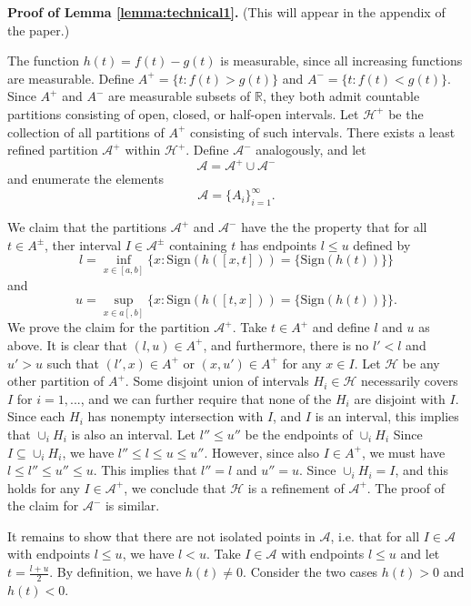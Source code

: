 \documentclass[12pt]{article}
\begin{document}
\textbf{Proof of Lemma \ref{lemma:technical1}.} (This will appear in the appendix of the paper.)

The function $h(t) = f(t) - g(t)$ is measurable, since all increasing
functions are measurable.  Define $A^+ = \{t: f(t) > g(t)\}$ and $A^-
= \{t: f(t) < g(t)\}$.  Since $A^+$ and $A^-$ are measurable subsets
of $\mathbb{R}$, they both admit countable partitions consisting of open, closed, or half-open
intervals.  Let $\mathcal{H}^+$ be the collection of all partitions of $A^+$ consisting of such intervals.
There exists a least refined partition $\mathcal{A}^+$ within $\mathcal{H}^+$.
Define $\mathcal{A}^-$ analogously, and let
\[
\mathcal{A} = \mathcal{A}^+ \cup \mathcal{A}^-
\]
and enumerate the elements
\[
\mathcal{A} = \{A_i\}_{i=1}^\infty.
\]

We claim that the partitions $\mathcal{A}^+$ and $\mathcal{A}^-$ have
the the property that for all $t \in A^\pm$, ther interval
$I \in \mathcal{A}^\pm$ containing $t$ has endpoints $l \leq u$
defined by
\[
l = \inf_{x \in [a,b]} \{x: \text{Sign}(h([x, t])) = \{\text{Sign}(h(t))\} \}
\]
and
\[
u = \sup_{x \in a[,b]} \{x: \text{Sign}(h([t, x])) = \{\text{Sign}(h(t))\}\}.
\]
We prove the claim for the partition $\mathcal{A}^+$.  Take $t \in
A^+$ and define $l$ and $u$ as above.  It is clear that $(l, u) \in
A^+$, and furthermore, there is no $l' < l$ and $u' > u$ such that
$(l', x) \in A^+$ or $(x, u') \in A^+$ for any $x \in I$.  Let
$\mathcal{H}$ be any other partition of $A^+$.  Some disjoint union of
intervals $H_i \in \mathcal{H}$ necessarily covers $I$ for $i =
1,...$, and we can further require that none of the $H_i$ are disjoint
with $I$.  Since each $H_i$ has nonempty intersection with $I$, and
$I$ is an interval, this implies that $\cup_i H_i$ is also an
interval.  Let $l'' \leq u''$ be the endpoints of $\cup_i H_i$ Since
$I \subseteq \cup_i H_i$, we have $l'' \leq l \leq u \leq u''$.
However, since also $I \in A^+$, we must have $l \leq l'' \leq
u'' \leq u$.  This implies that $l''=l$ and $u''=u$.  Since $\cup_i
H_i = I$, and this holds for any $I \in \mathcal{A}^+$, we conclude
that $\mathcal{H}$ is a refinement of $\mathcal{A}^+$. The proof of
the claim for $\mathcal{A}^-$ is similar.

It remains to show that there are not isolated points in
$\mathcal{A}$, i.e. that for all $I \in \mathcal{A}$ with endpoints
$l \leq u$, we have $l < u$.  Take $I \in \mathcal{A}$ with endpoints
$l \leq u$ and let $t = \frac{l+u}{2}$.  By definition, we have
$h(t) \neq 0$.  Consider the two cases $h(t) > 0$ and $h(t) < 0$.
\end{document}
